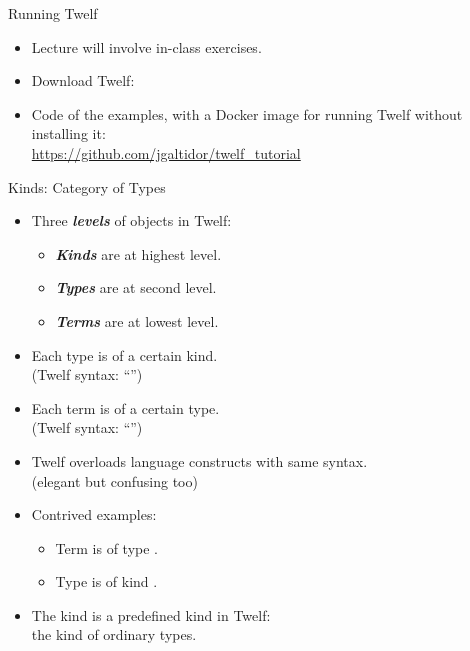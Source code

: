 \documentclass{beamer}
\renewcommand{\emph}[1]{\textbf{\textit{#1}}}
\begin{document}
\begin{frame}{Running Twelf}
\begin{itemize}
\item Lecture will involve in-class exercises.
\item Download Twelf:
\end{itemize}
\begin{center}
\begin{Large}
\end{Large}
\end{center}
\begin{itemize}
\item Code of the examples, with a Docker image for running
Twelf without installing it: \\
\url{https://github.com/jgaltidor/twelf_tutorial}
\end{itemize}
\end{frame}

\begin{frame}{Kinds: Category of Types}
\begin{itemize}
\item
Three \emph{levels} of objects in Twelf:
  \begin{itemize}
  \item \emph{Kinds} are at highest level.
  \item \emph{Types} are at second level.
  \item \emph{Terms} are at lowest level.
  \end{itemize}

\pause
\item Each type is of a certain kind. \\
(Twelf syntax: ``'')
\item Each term is of a certain type. \\
(Twelf syntax: ``'')
\item Twelf overloads language constructs with same syntax. \\
(elegant but confusing too)

\pause
\item Contrived examples:
  \begin{itemize}
  \item Term \code{[1, 2, 3]} is of type .
  \item Type  is of kind .
  \end{itemize}

\pause
\item The kind  is a predefined kind in Twelf: \\
the kind of ordinary types.
\end{itemize}
\end{frame}
\end{document}
